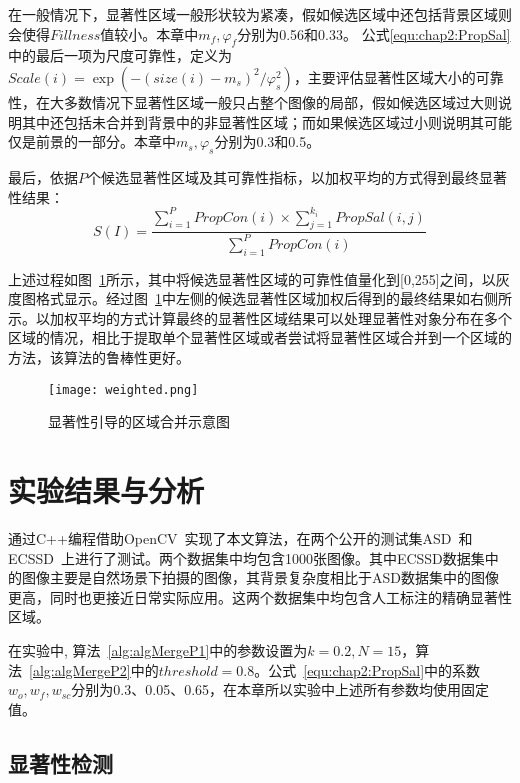 在一般情况下，显著性区域一般形状较为紧凑，假如候选区域中还包括背景区域则会使得$Fillness$值较小。本章中$m_f,\varphi_f$分别为0.56和0.33。 公式\ref{equ:chap2:PropSal}中的最后一项为尺度可靠性，定义为$Scale(i)= \exp(-(size(i)- m_s)^2/\varphi_s^2)$，主要评估显著性区域大小的可靠性，在大多数情况下显著性区域一般只占整个图像的局部，假如候选区域过大则说明其中还包括未合并到背景中的非显著性区域；而如果候选区域过小则说明其可能仅是前景的一部分。本章中$m_s,\varphi_s$分别为0.3和0.5。\par

最后，依据$P$个候选显著性区域及其可靠性指标，以加权平均的方式得到最终显著性结果：
$$ S(I) = \frac{\sum_{i=1}^{P}PropCon(i) \times \sum_{j=1}^{k_i}PropSal(i,j)}{\sum_{i=1}^{P}PropCon(i)}$$

上述过程如图~\ref{fig:weighted}所示，其中将候选显著性区域的可靠性值量化到[0,255]之间，以灰度图格式显示。经过图~\ref{fig:weighted}中左侧的候选显著性区域加权后得到的最终结果如右侧所示。以加权平均的方式计算最终的显著性区域结果可以处理显著性对象分布在多个区域的情况，相比于提取单个显著性区域或者尝试将显著性区域合并到一个区域的方法，该算法的鲁棒性更好。
\begin{figure}[htb]
  \centering%
      {\texttt{[image: weighted.png]}}\\

  \caption{显著性引导的区域合并示意图}
  \label{fig:weighted}
\end{figure}

\section{实验结果与分析}
\label{sec:results}


通过C++编程借助OpenCV~\cite{opencv_library}实现了本文算法，在两个公开的测试集ASD~\cite{Achanta08}和ECSSD~\cite{ECSSD}上进行了测试。两个数据集中均包含1000张图像。其中ECSSD数据集中的图像主要是自然场景下拍摄的图像，其背景复杂度相比于ASD数据集中的图像更高，同时也更接近日常实际应用。这两个数据集中均包含人工标注的精确显著性区域。\par
在实验中, 算法~\ref{alg:algMergeP1}中的参数设置为$k=0.2,N=15$，算法~\ref{alg:algMergeP2}中的$threshold=0.8$。公式~\ref{equ:chap2:PropSal}中的系数$w_o,w_f,w_{sc}$分别为0.3、0.05、0.65，在本章所以实验中上述所有参数均使用固定值。

\subsection{显著性检测}
\label{sec:sub:saliencyRst}

